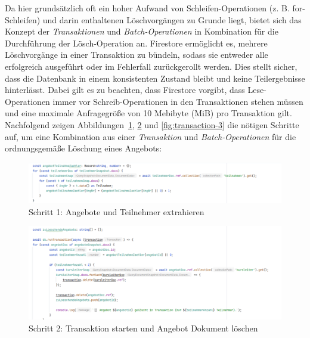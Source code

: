 \documentclass[12pt,a4paper%
              ,oneside     %
              ,titlepage
              ,DIV=13
              ,headinclude
              ,footinclude=false%
              ,cleardoublepage=empty%
              ,parskip=half,
              BCOR=0mm,
              ]{scrreprt}
\begin{document}
Da hier grundsätzlich oft ein hoher Aufwand von Schleifen-Operationen (z. B. for-Schleifen) und darin enthaltenen Löschvorgängen zu Grunde liegt, bietet sich das Konzept der \textit{Transaktionen} und \textit{Batch-Operationen} \cite{Firebase.TransaktionenBatch} in Kombination für die Durchführung der Lösch-Operation an. Firestore ermöglicht es, mehrere Löschvorgänge in einer Transaktion zu bündeln, sodass sie entweder alle erfolgreich ausgeführt oder im Fehlerfall zurückgerollt werden. Dies stellt sicher, dass die Datenbank in einem konsistenten Zustand bleibt und keine Teilergebnisse hinterlässt.
Dabei gilt es zu beachten, dass Firestore vorgibt, dass Lese-Operationen immer vor Schreib-Operationen in den Transaktionen stehen müssen und eine maximale Anfragegröße von 10 Mebibyte (MiB) pro Transaktion gilt.
Nachfolgend zeigen Abbildungen~\ref{fig:transaction-1}, \ref{fig:transaction-2} und \ref{fig:transaction-3} die nötigen Schritte auf, um eine Kombination aus einer \textit{Transaktion} und \textit{Batch-Operationen} für die ordnungsgemäße Löschung eines Angebots:

\begin{figure}[H]
	\centering
	\includegraphics[width=\linewidth]{img/transaction_1.png}
	\caption{Schritt 1: Angebote und Teilnehmer extrahieren}
	\label{fig:transaction-1}
\end{figure}

\begin{figure}[H]
	\centering
	\includegraphics[width=\linewidth]{img/transaction_2.png}
	\caption{Schritt 2: Transaktion starten und Angebot Dokument löschen}
	\label{fig:transaction-2}
\end{figure}
\end{document}
